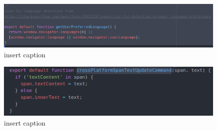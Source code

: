 \begin{figure}[H]
	\centering
	\includegraphics[width=\linewidth]{code6}
	\caption{insert caption}
\end{figure}

\begin{figure}[H]
	\centering
	\includegraphics[scale=.7]{code7}
	\caption{insert caption}
\end{figure}

